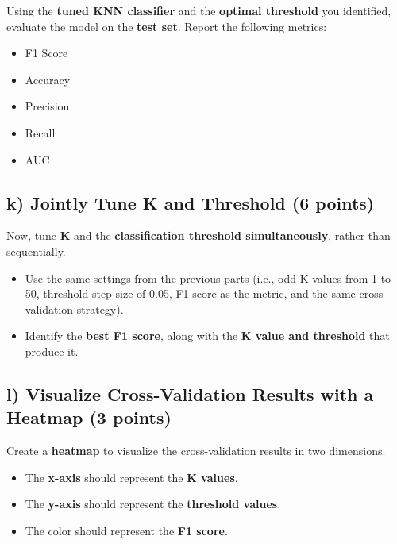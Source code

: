 \documentclass[
  letterpaper,
  DIV=11,
  numbers=noendperiod]{scrreprt}
\providecommand{\tightlist}{%
  \setlength{\itemsep}{0pt}\setlength{\parskip}{0pt}}\usepackage{longtable,booktabs,array}
\begin{document}
Using the \textbf{tuned KNN classifier} and the \textbf{optimal
threshold} you identified, evaluate the model on the \textbf{test set}.
Report the following metrics:

\begin{itemize}
\tightlist
\item
  F1 Score\\
\item
  Accuracy\\
\item
  Precision\\
\item
  Recall\\
\item
  AUC
\end{itemize}

\subsection{\texorpdfstring{k) Jointly Tune K and Threshold \textbf{(6
points)}}{k) Jointly Tune K and Threshold (6 points)}}\label{k-jointly-tune-k-and-threshold-6-points}

Now, tune \textbf{K} and the \textbf{classification threshold
simultaneously}, rather than sequentially.

\begin{itemize}
\tightlist
\item
  Use the same settings from the previous parts (i.e., odd K values from
  1 to 50, threshold step size of 0.05, F1 score as the metric, and the
  same cross-validation strategy).
\item
  Identify the \textbf{best F1 score}, along with the \textbf{K value
  and threshold} that produce it.
\end{itemize}

\subsection{\texorpdfstring{l) Visualize Cross-Validation Results with a
Heatmap \textbf{(3
points)}}{l) Visualize Cross-Validation Results with a Heatmap (3 points)}}\label{l-visualize-cross-validation-results-with-a-heatmap-3-points}

Create a \textbf{heatmap} to visualize the cross-validation results in
two dimensions.

\begin{itemize}
\tightlist
\item
  The \textbf{x-axis} should represent the \textbf{K values}.
\item
  The \textbf{y-axis} should represent the \textbf{threshold values}.
\item
  The color should represent the \textbf{F1 score}.
\end{itemize}
\end{document}
